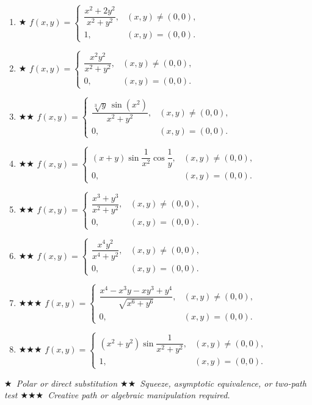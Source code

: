 \documentclass[12pt,a4paper]{article}
\newcommand{\easy}{{\color{green!60!black}$\bigstar$}}
\newcommand{\medium}{{\color{orange}$\bigstar\bigstar$}}
\newcommand{\hard}{{\color{red}$\bigstar\bigstar\bigstar$}}
\begin{document}
\begin{enumerate}[leftmargin=*, label=(\alph*)]

\item \easy\quad
$f(x,y)=\begin{cases}
\dfrac{x^2+2y^2}{x^2+y^2}, & (x,y)\ne(0,0),\\[6pt]
1, & (x,y)=(0,0).
\end{cases}$

\item \easy\quad
$f(x,y)=\begin{cases}
\dfrac{x^2 y^2}{x^2+y^2}, & (x,y)\ne(0,0),\\[6pt]
0, & (x,y)=(0,0).
\end{cases}$

\item \medium\quad
$f(x,y)=\begin{cases}
\dfrac{\sqrt[3]{y}\,\sin(x^2)}{x^2+y^2}, & (x,y)\ne(0,0),\\[6pt]
0, & (x,y)=(0,0).
\end{cases}$

\item \medium\quad
$f(x,y)=\begin{cases}
(x+y)\sin\!\dfrac{1}{x^2}\cos\!\dfrac{1}{y}, & (x,y)\ne(0,0),\\[6pt]
0, & (x,y)=(0,0).
\end{cases}$

\item \medium\quad
$f(x,y)=\begin{cases}
\dfrac{x^3+y^3}{x^2+y^2}, & (x,y)\ne(0,0),\\[6pt]
0, & (x,y)=(0,0).
\end{cases}$

\item \medium\quad
$f(x,y)=\begin{cases}
\dfrac{x^4 y^2}{x^4+y^2}, & (x,y)\ne(0,0),\\[6pt]
0, & (x,y)=(0,0).
\end{cases}$

\item \hard\quad
$f(x,y)=\begin{cases}
\dfrac{x^4-x^3 y-xy^3+y^4}{\sqrt{x^6+y^6}}, & (x,y)\ne(0,0),\\[6pt]
0, & (x,y)=(0,0).
\end{cases}$

\item \hard\quad
$f(x,y)=\begin{cases}
(x^2+y^2)\sin\!\dfrac{1}{x^2+y^2}, & (x,y)\ne(0,0),\\[6pt]
1, & (x,y)=(0,0).
\end{cases}$

\end{enumerate}

\bigskip
\begin{center}
\small\itshape
\easy\ Polar or direct substitution\quad
\medium\ Squeeze, asymptotic equivalence, or two-path test\quad
\hard\ Creative path or algebraic manipulation required.
\end{center}
\end{document}
